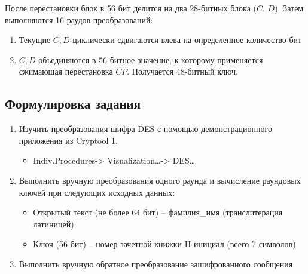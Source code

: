 \documentclass[a4paper, 14pt]{extarticle}
\begin{document}
После перестановки блок в 56 бит делится на два 28-битных блока ($C$, $D$). Затем выполняются 16 раудов преобразований:
\begin{enumerate}
    \item Текущие $C, D$ циклически сдвигаются влева на определенное количество бит
    \item $C, D$ объединяются в 56-битное значение, к которому применяется сжимающая перестановка $CP$. Получается 48-битный ключ.
\end{enumerate}


\FloatBarrier{}
\subsection{Формулировка задания}

\begin{enumerate}
    \item Изучить преобразования шифра DES с помощью демонстрационного приложения из Cryptool 1.
        \begin{itemize}
            \item Indiv.Procedures-> Visualization…-> DES…
        \end{itemize}
    \item Выполнить вручную преобразования одного раунда и вычисление раундовых ключей при следующих исходных данных:
        \begin{itemize}
            \item Открытый текст (не более 64 бит) – фамилия\_имя (транслитерация латиницей)
            \item Ключ (56 бит) – номер зачетной книжки II инициал (всего 7 символов)
        \end{itemize}
    \item Выполнить вручную обратное преобразование зашифрованного сообщения
\end{enumerate}
\end{document}

